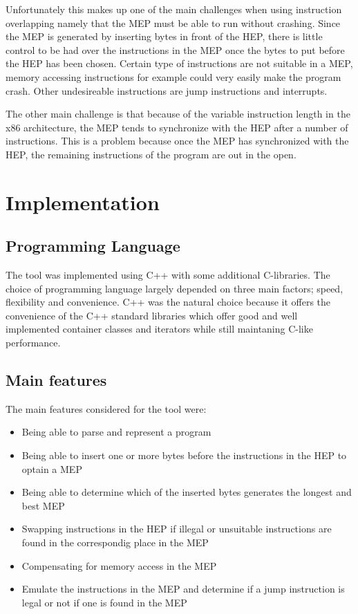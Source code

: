 \documentclass[11pt,twoside]{eitExjobb}
\begin{document}
Unfortunately this makes up one of the main challenges when using instruction overlapping namely that the MEP must be able to run without crashing. Since the MEP is generated by inserting bytes in front of the HEP, there is little control to be had over the instructions in the MEP once the bytes to put before the HEP has been chosen.  Certain type of instructions are not suitable in a MEP, memory accessing instructions for example could very easily make the program crash. Other undesireable instructions are jump instructions  and interrupts.

The other main challenge is that because of the variable instruction length in the x86 architecture, the MEP tends to synchronize with the HEP after a number of instructions. This is a problem because once the MEP has synchronized with the HEP, the remaining instructions of the program are out in the open.  


\chapter{Implementation}
\section{Programming Language}
The tool was implemented using C++ with some additional C-libraries. The choice of programming language largely depended on three main factors; speed, flexibility and convenience. C++ was the natural choice because it offers the convenience of the C++ standard libraries which offer good and well implemented container classes and iterators while still maintaning C-like performance.

\section{Main features}
The main features considered for the tool were:

\begin{itemize}
\item{Being able to parse and represent a program}
\item{Being able to insert one or more bytes before the instructions in the HEP to optain a MEP}
\item{Being able to determine which of the inserted bytes generates the longest and best MEP}
\item{Swapping instructions in the HEP if illegal or unsuitable instructions are found in the correspondig place in the MEP}
\item{Compensating for memory access in the MEP}
\item{Emulate the instructions in the MEP and determine if a jump instruction is legal or not if one is found in the MEP}
\end{itemize}
\end{document}
